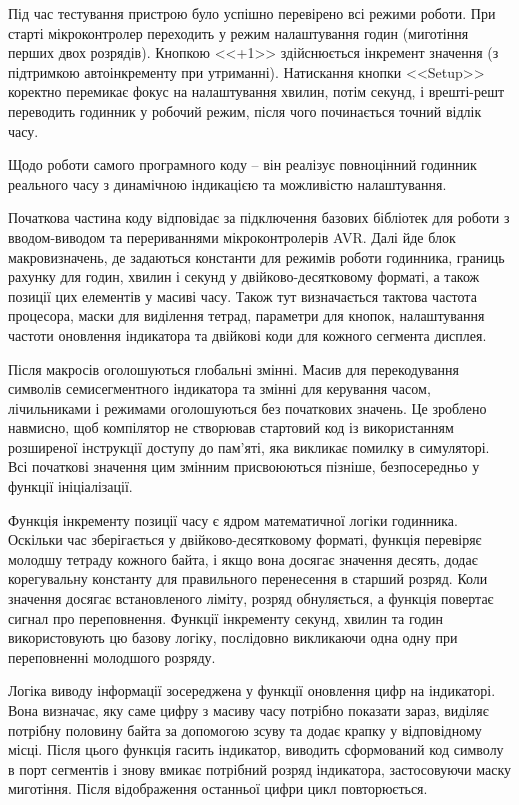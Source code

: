\documentclass[14pt, a4paper]{extreport}
\begin{document}
	
	Під час тестування пристрою було успішно перевірено всі режими роботи. При старті мікроконтролер переходить у режим налаштування годин (миготіння перших двох розрядів). Кнопкою <<+1>> здійснюється інкремент значення (з підтримкою автоінкременту при утриманні). Натискання кнопки <<Setup>> коректно перемикає фокус на налаштування хвилин, потім секунд, і врешті-решт переводить годинник у робочий режим, після чого починається точний відлік часу.
	
	Щодо роботи самого програмного коду -- він реалізує повноцінний годинник реального часу з динамічною індикацією та можливістю налаштування.
	
	Початкова частина коду відповідає за підключення базових бібліотек для роботи з вводом-виводом та перериваннями мікроконтролерів AVR. Далі йде блок макровизначень, де задаються константи для режимів роботи годинника, границь рахунку для годин, хвилин і секунд у двійково-десятковому форматі, а також позиції цих елементів у масиві часу. Також тут визначається тактова частота процесора, маски для виділення тетрад, параметри для кнопок, налаштування частоти оновлення індикатора та двійкові коди для кожного сегмента дисплея.
	
	Після макросів оголошуються глобальні змінні. Масив для перекодування символів семисегментного індикатора та змінні для керування часом, лічильниками і режимами оголошуються без початкових значень. Це зроблено навмисно, щоб компілятор не створював стартовий код із використанням розширеної інструкції доступу до пам'яті, яка викликає помилку в симуляторі. Всі початкові значення цим змінним присвоюються пізніше, безпосередньо у функції ініціалізації.
	
	Функція інкременту позиції часу є ядром математичної логіки годинника. Оскільки час зберігається у двійково-десятковому форматі, функція перевіряє молодшу тетраду кожного байта, і якщо вона досягає значення десять, додає корегувальну константу для правильного перенесення в старший розряд. Коли значення досягає встановленого ліміту, розряд обнуляється, а функція повертає сигнал про переповнення. Функції інкременту секунд, хвилин та годин використовують цю базову логіку, послідовно викликаючи одна одну при переповненні молодшого розряду.
	
	Логіка виводу інформації зосереджена у функції оновлення цифр на індикаторі. Вона визначає, яку саме цифру з масиву часу потрібно показати зараз, виділяє потрібну половину байта за допомогою зсуву та додає крапку у відповідному місці. Після цього функція гасить індикатор, виводить сформований код символу в порт сегментів і знову вмикає потрібний розряд індикатора, застосовуючи маску миготіння. Після відображення останньої цифри цикл повторюється.
	
\end{document}
